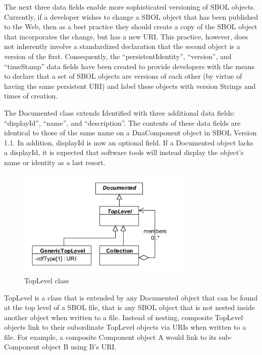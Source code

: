 \documentclass[draftspec]{sbmlpkgspec}
\begin{document}
The next three data fields enable more sophisticated versioning of SBOL objects. Currently, if a developer wishes to change a SBOL object that has been published to the Web, then as a best practice they should create a copy of the SBOL object that incorporates the change, but has a new URI. This practice, however, does not inherently involve a standardized declaration that the second object is a version of the first. Consequently, the ``persistentIdentity'', ``version'', and ``timeStamp'' data fields have been created to provide developers with the means to declare that a set of SBOL objects are versions of each other (by virtue of having the same persistent URI) and label these objects with version Strings and times of creation.

The Documented class extends Identified with three additional data fields: ``displayId'', ``name'', and ``description''. The contents of these data fields are identical to those of the same name on a DnaComponent object in SBOL Version 1.1. In addition, displayId is now an optional field. If a Documented object lacks a displayId, it is expected that software tools will instead display the object's name or identity as a last resort.

\begin{figure}[h]
\begin{center}
\includegraphics[width=0.75\textwidth]{uml/toplevel_collection}
\caption[]{TopLevel class}
\label{uml:toplevel_collection}
\end{center}
\end{figure}

TopLevel is a class that is extended by any Documented object that can be found at the top level of a SBOL file, that is any SBOL object that is not nested inside another object when written to a file. Instead of nesting, composite TopLevel objects link to their subordinate TopLevel objects via URIs when written to a file. For example, a composite Component object A would link to its sub-Component object B using B’s URI.
\end{document}
